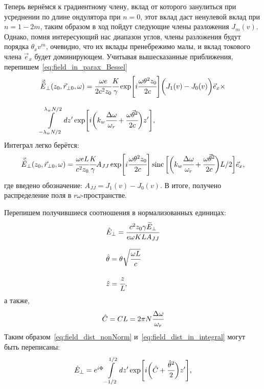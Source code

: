 Теперь вернёмся к градиентному члену, вклад от которого занулиться при усреднении по длине ондулятора при $n = 0$, этот вклад даст ненулевой вклад при $n = 1 - 2m$, таким образом в ход пойдут следующие члены разложения $J_m(v)$. Однако, помня интересующий нас диапазон углов, члены разложения будут порядка $\theta_x v^m$, очевидно, что их вклады пренебрежимо малы, и вклад токового члена $\vec{e}_x$ будет доминирующем. Учитывая вышесказанные приближения, перепишем~\ref{eq:field_in_parax_Bessel}
\begin{equation}
	\label{eq:field_dist_in_integral}
	\begin{array}{lcl}
		\vec{\widetilde{E}}_{\bot}(z_0,  \vec{r}_{\bot 0}, \omega) =
		\cfrac{\omega e}{2c^2z_0}\cfrac{K}{\gamma}\exp[i\cfrac{\omega \theta^2 z_0}{2c}]
		\bigg(J_1(v) - J_0(v)\bigg)\vec{e}_x\times\\
		\\
		\displaystyle\int\limits_{-\lambda_w N/2}^{\lambda_w N/2} dz'
		\exp[i\bigg(k_w \cfrac{\Delta\omega}{\omega_r} + 
		\cfrac{\omega\vec{\theta}^2}{2c}\bigg)z'],
	\end{array}	
\end{equation}
Интеграл легко берётся:
\begin{equation}
	\label{eq:field_dist_nonNorm}
	\begin{array}{lcl}
		\vec{\widetilde{E}}_{\bot}(z_0,  \vec{r}_{\bot 0}, \omega) =
		\cfrac{\omega eL}{c^2z_0}\cfrac{K}{\gamma}A_{JJ}\exp[i\cfrac{\omega \theta^2 z_0}{2c}]
		\operatorname{sinc} \bigg[\bigg(k_w \cfrac{\Delta\omega}{\omega_r} + 
		\cfrac{\omega\vec{\theta}^2}{2c}\bigg)L/2 \bigg ]\vec{e}_x ,
	\end{array}	
\end{equation}
где введено обозначение: $A_{JJ} = J_1(v) - J_0(v)$. В итоге, получено распределение поля в $r\omega$-пространстве. 

Перепишем получившиеся соотношения в нормализованных единицах:
\begin{equation}
	\label{eq:norm_units}
	\begin{array}{lcl}
		\hat{E}_{\bot} = \cfrac{c^2z_0\gamma \widetilde{E}_{\bot}}{e\omega KLA_{JJ}}\\
		\\
		\hat{\theta} = \theta\sqrt{\cfrac{\omega L}{c}}\\
		\\
		\hat{z} = \cfrac{z}{L} ,
	\end{array}	
\end{equation}
а также, 
\begin{equation}
	\hat{C} = CL = 2\pi N\cfrac{\Delta\omega}{\omega_r}
\end{equation}
Таким образом~\ref{eq:field_dist_nonNorm} и~\ref{eq:field_dist_in_integral} могут быть переписаны:
\begin{equation}
	\label{eq:field_dist_in_integral}
	\begin{array}{lcl}
		\hat{E}_{\bot} = e^{i\Phi}
		\displaystyle\int\limits_{-1/2}^{1/2} dz'
		\exp[i\bigg(\hat{C} + 
		\cfrac{\hat{\theta}^2}{2}\bigg)z'],
	\end{array}	
\end{equation}


